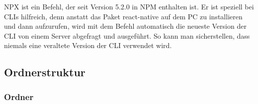 NPX ist ein Befehl, der seit Version 5.2.0 in NPM enthalten ist. Er ist speziell bei CLIs hilfreich,
denn anstatt das Paket react-native auf dem PC zu installieren und dann aufzurufen, wird mit dem
Befehl automatisch die neueste Version der CLI von einem Server abgefragt und ausgeführt. So kann
man sicherstellen, dass niemals eine veraltete Version der CLI verwendet wird.

\newpage

\subsection{Ordnerstruktur}

\subsubsection{Ordner}


